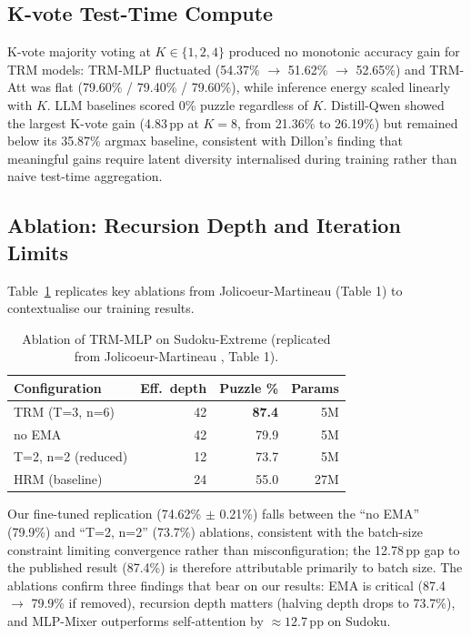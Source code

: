 \documentclass{article}
\begin{document}
\subsection{K-vote Test-Time Compute}
\label{sec:kvote_results}

K-vote majority voting at $K\in\{1,2,4\}$ produced no monotonic accuracy gain for TRM models: TRM-MLP fluctuated (54.37\% $\rightarrow$ 51.62\% $\rightarrow$ 52.65\%) and TRM-Att was flat (79.60\% / 79.40\% / 79.60\%), while inference energy scaled linearly with $K$. LLM baselines scored 0\% puzzle regardless of $K$. Distill-Qwen showed the largest K-vote gain (4.83\,pp at $K=8$, from 21.36\% to 26.19\%) but remained below its 35.87\% argmax baseline, consistent with Dillon's  finding that meaningful gains require latent diversity internalised during training rather than naive test-time aggregation.

\subsection{Ablation: Recursion Depth and Iteration Limits}

Table~\ref{tab:ablation} replicates key ablations from Jolicoeur-Martineau  (Table 1) to contextualise our training results.

\begin{table}[t]
\centering
\small
\begin{tabular}{lrrr}
\toprule
\textbf{Configuration} & \textbf{Eff.\ depth} & \textbf{Puzzle \%} & \textbf{Params} \\
\midrule
TRM (T=3, n=6)       & 42 & \textbf{87.4} & 5M  \\
no EMA               & 42 & 79.9          & 5M  \\
T=2, n=2 (reduced)   & 12 & 73.7          & 5M  \\
HRM (baseline)       & 24 & 55.0          & 27M \\
\bottomrule
\end{tabular}
\caption{Ablation of TRM-MLP on Sudoku-Extreme (replicated from Jolicoeur-Martineau \protect{}, Table 1).}
\label{tab:ablation}
\end{table}

Our fine-tuned replication (74.62\% $\pm$ 0.21\%) falls between the ``no EMA'' (79.9\%) and ``T=2, n=2'' (73.7\%) ablations, consistent with the batch-size constraint limiting convergence rather than misconfiguration; the 12.78\,pp gap to the published result (87.4\%) is therefore attributable primarily to batch size. The ablations confirm three findings that bear on our results: EMA is critical (87.4 $\rightarrow$ 79.9\% if removed), recursion depth matters (halving depth drops to 73.7\%), and MLP-Mixer outperforms self-attention by ${\approx}12.7$\,pp on Sudoku.
\end{document}
